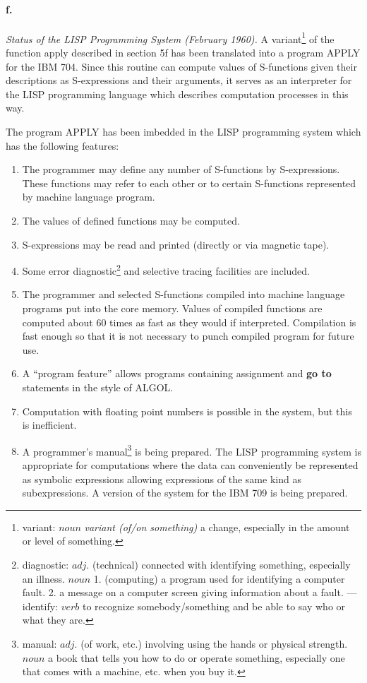 \documentclass[11pt, a4paper]{article}
\begin{document}
\paragraph{f.}\textit{Status of the LISP Programming System (February 1960).}
A
variant\footnote{variant: $noun$ \textit{variant (of/on something)} a change,
  especially in the amount or level of something.}
of the function apply described in section 5f has been translated into
a program APPLY for the IBM 704. Since this routine can compute values of
S-functions given their descriptions as S-expressions and their arguments, it
serves as an interpreter for the LISP programming language which describes
computation processes in this way.

The program APPLY has been imbedded in the LISP programming system which has the
following features:
\begin{enumerate}
\item The programmer may define any number of S-functions by
  S-expressions. These functions may refer to each other or to certain
  S-functions represented by machine language program.
\item The values of defined functions may be computed.
\item S-expressions may be read and printed (directly or via magnetic tape).
\item Some error
  diagnostic\footnote{diagnostic: $adj.$ (technical) connected with identifying
    something, especially an illness. $noun$ 1. (computing) a program used for
    identifying a computer fault. 2. a message on a computer screen giving
    information about a fault. --- identify: $verb$ to recognize
    somebody/something and be able to say who or what they are.}
  and selective tracing facilities are included.
\item The programmer and selected S-functions compiled into machine language
  programs put into the core memory. Values of compiled functions are computed
  about 60 times as fast as they would if interpreted. Compilation is fast
  enough so that it is not necessary to punch compiled program for future use.
\item A ``program feature'' allows programs containing assignment and \textbf{go
  to} statements in the style of ALGOL.
\item Computation with floating point numbers is possible in the system, but
  this is inefficient.
\item A programmer's
  manual\footnote{manual: $adj.$ (of work, etc.) involving using the hands or
    physical strength. $noun$ a book that tells you how to do or operate
    something, especially one that comes with a machine, etc. when you buy it.}
  is being prepared. The LISP programming system is
  appropriate for computations where the data can conveniently be represented as
  symbolic expressions allowing expressions of the same kind as
  subexpressions. A version of the system for the IBM 709 is being prepared.
\end{enumerate}
\end{document}
